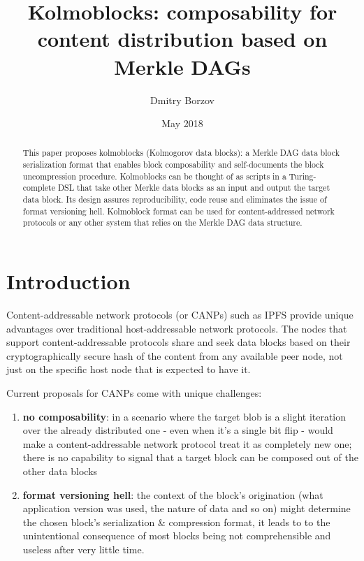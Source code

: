 \documentclass[twocolumn,aps,pra,floatfix]{revtex4-1}
\begin{document}
\title{Kolmoblocks: composability for content distribution based on Merkle DAGs}
\author{Dmitry Borzov}
\date{May 2018}

\begin{abstract}
This paper proposes kolmoblocks (Kolmogorov data blocks): a Merkle DAG data block serialization format that enables block composability and self-documents the block uncompression procedure. Kolmoblocks can be thought of as scripts in a Turing-complete DSL that take other Merkle data blocks as an input and output the target data block. Its design assures reproducibility, code reuse and eliminates the issue of format versioning hell.  Kolmoblock format can be used for content-addressed network protocols or any other system that relies on the Merkle DAG data structure.
\end{abstract}
\maketitle





\section{Introduction}

Content-addressable network protocols (or CANPs) such as IPFS\cite{IPFS} provide unique advantages over traditional host-addressable network protocols. The nodes that support content-addressable protocols share and seek data blocks based on their cryptographically secure hash of the content from any available peer node, not just on the specific host node that is expected to have it.

Current proposals for CANPs come with unique challenges:
\begin{enumerate}
  \item \textbf{no composability}: in a scenario where the target blob is a slight iteration over the already distributed one - even when it's a single bit flip - would make a content-addressable network protocol treat it as completely new one; there is no capability to signal that a target block can be composed out of the other data blocks  
   \item \textbf{format versioning hell}: the context of the block's origination (what application version was used, the nature of data and so on) might determine the chosen block's serialization \& compression format, it leads to to the unintentional consequence of most blocks being not comprehensible and useless after very little time.
\end{enumerate}
\end{document}
